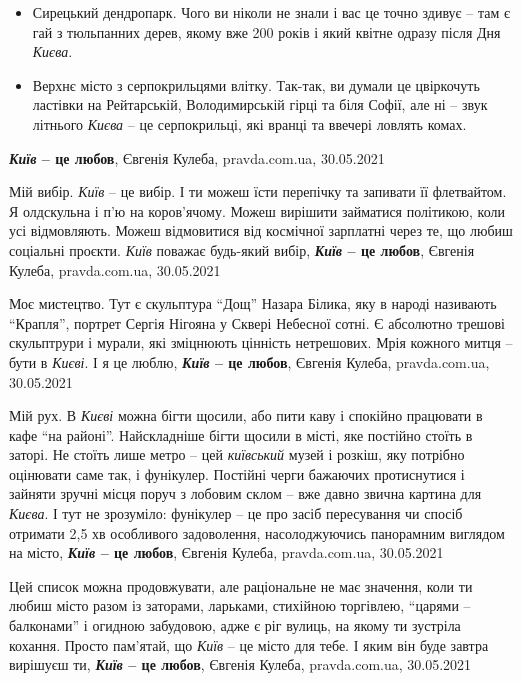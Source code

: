 \begin{itemize}
\item Сирецький дендропарк. Чого ви ніколи не знали і вас це точно здивує – там
        є гай з тюльпанних дерев, якому вже 200 років і який квітне одразу
        після Дня \emph{Києва}.
\item Верхнє місто з серпокрильцями влітку. Так-так, ви думали це цвіркочуть
        ластівки на Рейтарській, Володимирській гірці та біля Софії, але ні –
        звук літнього \emph{Києва} – це серпокрильці, які вранці та ввечері ловлять
        комах.
\end{itemize}
\textbf{\emph{Київ} – це любов}, Євгенія Кулеба, pravda.com.ua, 30.05.2021

Мій вибір. \emph{Київ} – це вибір. І ти можеш їсти перепічку та запивати її
флетвайтом. Я олдскульна і п'ю на коров'ячому. Можеш вирішити займатися
політикою, коли усі відмовляють. Можеш відмовитися від космічної зарплатні
через те, що любиш соціальні проєкти. \emph{Київ} поважає будь-який вибір,
\textbf{\emph{Київ} – це любов}, Євгенія Кулеба, pravda.com.ua, 30.05.2021

Моє мистецтво. Тут є скульптура \enquote{Дощ} Назара Білика, яку в народі називають
\enquote{Крапля}, портрет Сергія Нігояна у Сквері Небесної сотні. Є абсолютно трешові
скульптрури і мурали, які зміцнюють цінність нетрешових. Мрія кожного митця –
бути в \emph{Києві}. І я це люблю,
\textbf{\emph{Київ} – це любов}, Євгенія Кулеба, pravda.com.ua, 30.05.2021

Мій рух. В \emph{Києві} можна бігти щосили, або пити каву і спокійно працювати в кафе
\enquote{на районі}. Найскладніше бігти щосили в місті, яке постійно стоїть в заторі.
Не стоїть лише метро – цей \emph{київський} музей і розкіш, яку потрібно оцінювати
саме так, і фунікулер. Постійні черги бажаючих протиснутися і зайняти зручні
місця поруч з лобовим склом – вже давно звична картина для \emph{Києва}. І тут не
зрозуміло: фунікулер – це про засіб пересування чи спосіб отримати 2,5 хв
особливого задоволення, насолоджуючись панорамним виглядом на місто,
\textbf{\emph{Київ} – це любов}, Євгенія Кулеба, pravda.com.ua, 30.05.2021

Цей список можна продовжувати, але раціональне не має значення, коли ти любиш
місто разом із заторами, ларьками, стихійною торгівлею, \enquote{царями – балконами} і
огидною забудовою, адже є ріг вулиць, на якому ти зустріла кохання.  Просто
пам'ятай, що \emph{Київ} – це місто для тебе. І яким він буде завтра вирішуєш ти,
\textbf{\emph{Київ} – це любов}, Євгенія Кулеба, pravda.com.ua, 30.05.2021

